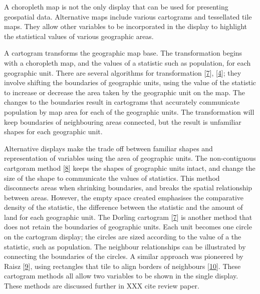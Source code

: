 \documentclass[conference,final,]{IEEEtran}
\begin{document}
A choropleth map is not the only display that can be used for presenting geospatial data.
Alternative maps include various cartograms and tessellated tile maps. They allow other variables to be incorporated in the display to highlight the statistical values of various geographic areas.

A cartogram transforms the geographic map base. The transformation begins with a choropleth map, and the values of a statistic such as population, for each geographic unit. There are several algorithms for transformation {[}\protect\hyperlink{ref-ACTUC}{7}{]}, {[}\protect\hyperlink{ref-CBATCC}{4}{]}; they involve shifting the boundaries of geographic units, using the value of the statistic to increase or decrease the area taken by the geographic unit on the map.
The changes to the boundaries result in cartograms that accurately communicate population by map area for each of the geographic units. The transformation will keep boundaries of neighbouring areas connected, but the result is unfamiliar shapes for each geographic unit.

Alternative displays make the trade off between familiar shapes and representation of variables using the area of geographic units. The non-contiguous cartgoram method {[}\protect\hyperlink{ref-NAC}{8}{]} keeps the shapes of geographic units intact, and change the size of the shape to communicate the values of statistics. This method disconnects areas when shrinking boundaries, and breaks the spatial relationship between areas. However, the empty space created emphasises the comparative density of the statistic, the difference between the statistic and the amount of land for each geographic unit.
The Dorling cartogram {[}\protect\hyperlink{ref-ACTUC}{7}{]} is another method that does not retain the boundaries of geographic units. Each unit becomes one circle on the cartogram display; the circles are sized according to the value of a the statistic, such as population. The neighbour relationships can be illustrated by connecting the boundaries of the circles. A similar approach was pioneered by Raisz {[}\protect\hyperlink{ref-RSCW}{9}{]}, using rectangles that tile to align borders of neighbours {[}\protect\hyperlink{ref-CDWCS}{10}{]}.
These cartogram methods all allow two variables to be shown in the single display. These methods are discussed further in XXX cite review paper.
\end{document}
